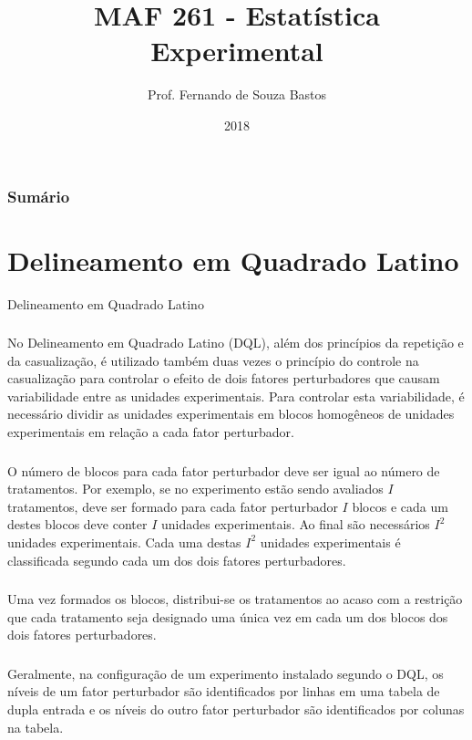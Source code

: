 \documentclass[14pt,aspectratio=1610]{beamer}
\title{MAF 261 - Estatística Experimental}
\author{Prof. Fernando de Souza Bastos}
\institute{Instituto de Ciências Exatas e Tecnológicas\texorpdfstring{\\ Universidade Federal de Viçosa}{}\texorpdfstring{\\ Campus UFV - Florestal}{}}
\date{2018}
\begin{document}


\frame{\titlepage}

\begin{frame}{}
\frametitle{\bf Sumário}
\tableofcontents
\end{frame}

\section{Delineamento em Quadrado Latino}
\begin{frame}{Delineamento em Quadrado Latino}
\frametitle{}
\begin{block}{}
\justifying
No Delineamento em Quadrado Latino (DQL), além dos princípios da repetição e
da casualização, é utilizado também duas vezes o princípio do controle na casualização para controlar o efeito de dois fatores perturbadores que causam variabilidade entre as unidades experimentais. Para controlar esta variabilidade, é necessário dividir as unidades experimentais em blocos homogêneos de unidades experimentais em relação a cada fator perturbador.
\end{block}
\end{frame}

\begin{frame}{}
\frametitle{}
\begin{block}{}
\justifying
O número de blocos para cada fator perturbador deve ser igual ao número de tratamentos. Por exemplo, se no experimento estão sendo avaliados $I$ tratamentos, deve ser formado para cada fator perturbador $I$ blocos e cada um destes blocos deve conter $I$ unidades experimentais. Ao final são necessários $I^{2}$ unidades experimentais. Cada uma destas $I^{2}$ unidades experimentais é classificada segundo cada um dos dois fatores perturbadores.
\end{block}
\end{frame}

\begin{frame}{}
\frametitle{}
\begin{block}{}
\justifying
Uma vez formados os blocos, distribui-se os tratamentos ao acaso com a restrição
que cada tratamento seja designado uma única vez em cada um dos blocos dos dois
fatores perturbadores.

\end{block}
\end{frame}

\begin{frame}{}
\frametitle{}
\begin{block}{}
\justifying
Geralmente, na configuração de um experimento instalado segundo o DQL, os níveis
de um fator perturbador são identificados por linhas em uma tabela de dupla entrada e os níveis do outro fator perturbador são identificados por colunas na tabela.
\end{block}
\end{frame}
\end{document}
